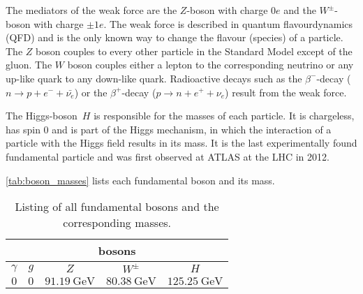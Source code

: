 The mediators of the weak force are the $Z$-boson with charge $0e$ and the $W^\pm$-boson with charge $\pm 1e$.
The weak force is described in quantum flavourdynamics (QFD) and is the only known way to change the flavour (species) of a particle.
The $Z$ boson couples to every other particle in the Standard Model except of the gluon.
The $W$ boson couples either a lepton to the corresponding neutrino or any up-like quark to any down-like quark.
Radioactive decays such as the $\beta^-$-decay ($n \rightarrow p + e^- + \bar{\nu_e}$) or the $\beta^+$-decay ($p \rightarrow n + e^+ + \nu_e$) result from the weak force.

The Higgs-boson~$H$ is responsible for the masses of each particle.
It is chargeless, has spin $0$ and is part of the Higgs mechanism, in which the interaction of a particle with the Higgs field results in its mass.
It is the last experimentally found fundamental particle and was first observed at ATLAS at the LHC in 2012.

\autoref{tab:boson_masses} lists each fundamental boson and its mass.

\begin{table}
    \centering
    \caption{Listing of all fundamental bosons and the corresponding masses. \cite{pdg}}
    \begin{tabular}{c c c c c}
        \toprule
        \multicolumn{5}{c}{bosons} \\
        \midrule
        $\gamma$ & $g$ & $Z$ & $W^\pm$ & $H$ \\
        $0$ & $0$ & $\qty{91.19}{\giga\eV}$ & $\qty{80.38}{\giga\eV}$ & $\qty{125.25}{\giga\eV}$ \\
        \bottomrule
    \end{tabular}
    \label{tab:boson_masses}
\end{table}

